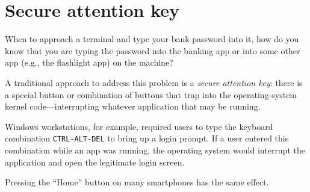 \section{Secure attention key}

When to approach a terminal and type your bank password into it,
how do you know that you are typing the password into 
the banking app or into some other app (e.g., the flashlight app)
on the machine?

A traditional approach to address this problem is a
\emph{secure attention key}: there is a special button
or combination of buttons that trap into the operating-system
kernel code---interrupting whatever application that may
be running.

Windows workstations, for example, required users to 
type the keyboard combination \texttt{CTRL-ALT-DEL} to
bring up a login prompt.
If a user entered this combination while an app was
running, the operating system would interrupt the
application and open the legitimate login screen.

Pressing the ``Home'' button on many smartphones 
has the same effect.
